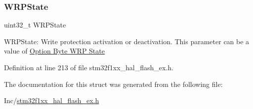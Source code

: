 \mbox{\label{struct_f_l_a_s_h___o_b_program_init_type_def_ab5ab320199482e9eb21dc8460501dea5}} 
\subsubsection{\texorpdfstring{W\+R\+P\+State}{WRPState}}
{\footnotesize\ttfamily uint32\+\_\+t W\+R\+P\+State}

W\+R\+P\+State\+: Write protection activation or deactivation. This parameter can be a value of \hyperlink{group___f_l_a_s_h_ex___o_b___w_r_p___state}{Option Byte W\+RP State} 

Definition at line 213 of file stm32f1xx\+\_\+hal\+\_\+flash\+\_\+ex.\+h.



The documentation for this struct was generated from the following file\+:\begin{DoxyCompactItemize}
\item 
Inc/\hyperlink{stm32f1xx__hal__flash__ex_8h}{stm32f1xx\+\_\+hal\+\_\+flash\+\_\+ex.\+h}\end{DoxyCompactItemize}
